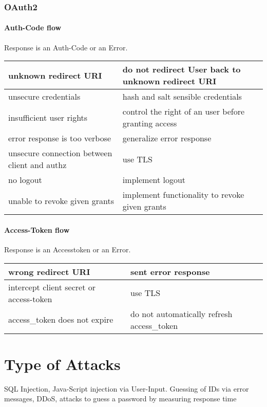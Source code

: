 \subsubsection{OAuth2}

\paragraph{Auth-Code flow}

Response is an Auth-Code or an Error.

\begin{tabular}{|l|l|}
    \hline
    unknown redirect URI & do not redirect User back to unknown redirect URI\\
    \hline
    unsecure credentials & hash and salt sensible credentials \\
    \hline
    insufficient user rights & control the right of an user before granting access \\
    \hline
    error response is too verbose & generalize error response \\
    \hline
    unsecure connection between client and authz & use TLS \\
    \hline
    no logout & implement logout \\
    \hline
    unable to revoke given grants & implement functionality to revoke given grants \\
    \hline
 \end{tabular}

\paragraph{Access-Token flow}

Response is an Accesstoken or an Error.

\begin{tabular}{|l|l|}
    \hline
    wrong redirect URI & sent error response\\
    \hline
    intercept client secret or access-token & use TLS \\
    \hline
    access\_token does not expire & do not automatically refresh access\_token \\
    \hline
 \end{tabular}

\section{Type of Attacks}
SQL Injection, Java-Script injection via User-Input.
Guessing of IDs via error messages, DDoS, 
attacks to guess a password by measuring response time
